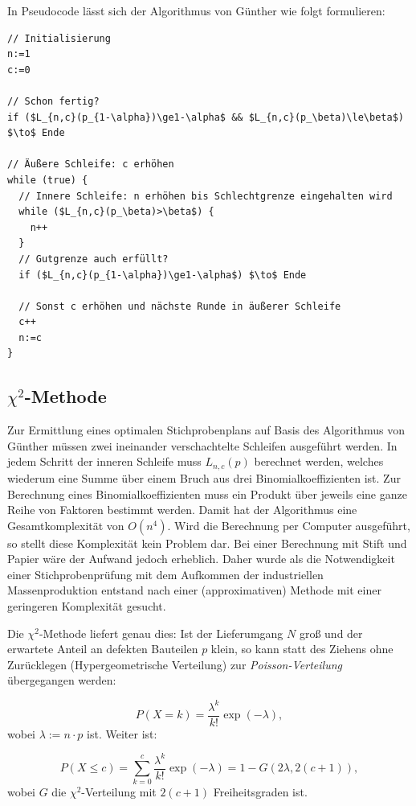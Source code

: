 \documentclass[a4paper,11pt,oneside]{article}
\begin{document}
In Pseudocode lässt sich der Algorithmus von Günther wie folgt formulieren:

\begin{lstlisting}[inputencoding={utf8},frame=single]
// Initialisierung
n:=1
c:=0

// Schon fertig?
if ($L_{n,c}(p_{1-\alpha})\ge1-\alpha$ && $L_{n,c}(p_\beta)\le\beta$) $\to$ Ende

// Äußere Schleife: c erhöhen
while (true) {
  // Innere Schleife: n erhöhen bis Schlechtgrenze eingehalten wird
  while ($L_{n,c}(p_\beta)>\beta$) {
    n++
  }
  // Gutgrenze auch erfüllt?
  if ($L_{n,c}(p_{1-\alpha})\ge1-\alpha$) $\to$ Ende

  // Sonst c erhöhen und nächste Runde in äußerer Schleife
  c++
  n:=c
}
\end{lstlisting}

\subsection[Chi-Quadrat-Methode]{$\chi^2$-Methode}

Zur Ermittlung eines optimalen Stichprobenplans auf Basis des Algorithmus von Günther müssen zwei ineinander verschachtelte Schleifen ausgeführt werden. In jedem Schritt der inneren Schleife muss $L_{n,c}(p)$ berechnet werden, welches wiederum eine Summe über einem Bruch aus drei Binomialkoeffizienten ist. Zur Berechnung eines Binomialkoeffizienten muss ein Produkt über jeweils eine ganze Reihe von Faktoren bestimmt werden. Damit hat der Algorithmus eine Gesamtkomplexität von $O(n^4)$. Wird die Berechnung per Computer ausgeführt, so stellt diese Komplexität kein Problem dar. Bei einer Berechnung mit Stift und Papier wäre der Aufwand jedoch erheblich. Daher wurde als die Notwendigkeit einer Stichprobenprüfung mit dem Aufkommen der industriellen Massenproduktion entstand nach einer (approximativen) Methode mit einer geringeren Komplexität gesucht.

Die $\chi^2$-Methode liefert genau dies: Ist der Lieferumgang $N$ groß und der erwartete Anteil an defekten Bauteilen $p$ klein, so kann statt des Ziehens ohne Zurücklegen (Hypergeometrische Verteilung) zur \emph{Poisson-Verteilung} übergegangen werden:

$$
P(X=k)=\frac{\lambda^k}{k!}\exp(-\lambda),
$$
wobei $\lambda:=n\cdot p$ ist. Weiter ist:

\begin{equation}\label{eq:LPoisson}
P(X\le c)=
\sum_{k=0}^c \frac{\lambda^k}{k!}\exp(-\lambda)=
1-G(2\lambda,2(c+1)),
\end{equation}
wobei $G$ die $\chi^2$-Verteilung mit $2(c+1)$ Freiheitsgraden ist.
\end{document}
